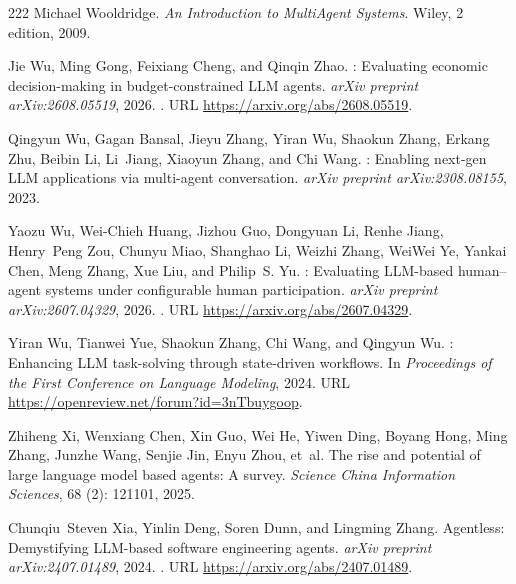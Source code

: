 \begin{thebibliography}{222}
Michael Wooldridge.
\newblock \emph{An Introduction to MultiAgent Systems}.
\newblock Wiley, 2 edition, 2009.

Jie Wu, Ming Gong, Feixiang Cheng, and Qinqin Zhao.
: Evaluating economic decision-making in
  budget-constrained {LLM} agents.
\newblock \emph{arXiv preprint arXiv:2608.05519}, 2026{}.
\newblock {}.
\newblock URL \url{https://arxiv.org/abs/2608.05519}.

Qingyun Wu, Gagan Bansal, Jieyu Zhang, Yiran Wu, Shaokun Zhang, Erkang Zhu,
  Beibin Li, Li~Jiang, Xiaoyun Zhang, and Chi Wang.
: Enabling next-gen {LLM} applications via multi-agent
  conversation.
\newblock \emph{arXiv preprint arXiv:2308.08155}, 2023.

Yaozu Wu, Wei-Chieh Huang, Jizhou Guo, Dongyuan Li, Renhe Jiang, Henry~Peng
  Zou, Chunyu Miao, Shanghao Li, Weizhi Zhang, WeiWei Ye, Yankai Chen, Meng
  Zhang, Xue Liu, and Philip~S. Yu.
: Evaluating {LLM}-based human--agent systems under
  configurable human participation.
\newblock \emph{arXiv preprint arXiv:2607.04329}, 2026{}.
\newblock {}.
\newblock URL \url{https://arxiv.org/abs/2607.04329}.

Yiran Wu, Tianwei Yue, Shaokun Zhang, Chi Wang, and Qingyun Wu.
: Enhancing {LLM} task-solving through state-driven
  workflows.
\newblock In \emph{Proceedings of the First Conference on Language Modeling},
  2024.
\newblock URL \url{https://openreview.net/forum?id=3nTbuygoop}.

Zhiheng Xi, Wenxiang Chen, Xin Guo, Wei He, Yiwen Ding, Boyang Hong, Ming
  Zhang, Junzhe Wang, Senjie Jin, Enyu Zhou, et~al.
\newblock The rise and potential of large language model based agents: A
  survey.
\newblock \emph{Science China Information Sciences}, 68 (2):
  121101, 2025.

Chunqiu~Steven Xia, Yinlin Deng, Soren Dunn, and Lingming Zhang.
\newblock Agentless: Demystifying {LLM}-based software engineering agents.
\newblock \emph{arXiv preprint arXiv:2407.01489}, 2024.
\newblock {}.
\newblock URL \url{https://arxiv.org/abs/2407.01489}.


\end{thebibliography}
